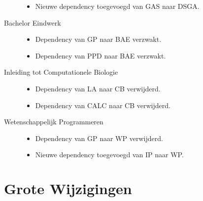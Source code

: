 \documentclass[a4paper]{article}
\begin{document}
\begin{multicols*}{2}
\begin{description}
\begin{itemize}
                    \item Nieuwe dependency toegevoegd van GAS naar DSGA.
            \end{itemize}
            \pagebreak[3]
            \item[Bachelor Eindwerk] \hfill
            \begin{itemize}
                    \item Dependency van GP naar BAE verzwakt.
                    \item Dependency van PPD naar BAE verzwakt.
            \end{itemize}
            \pagebreak[3]
            \item[Inleiding tot Computationele Biologie] \hfill
            \begin{itemize}
                    \item Dependency van LA naar CB verwijderd.
                    \item Dependency van CALC naar CB verwijderd.
            \end{itemize}
            \pagebreak[3]
            \item[Wetenschappelijk Programmeren] \hfill
            \begin{itemize}
                    \item Dependency van GP naar WP verwijderd.
                    \item Nieuwe dependency toegevoegd van IP naar WP.
            \end{itemize}
        \end{description}
    \end{multicols*}

    \restoregeometry

    \newpage
    \section{Grote Wijzigingen}
    \label{sec:grote_wijzigingen}
\end{document}
